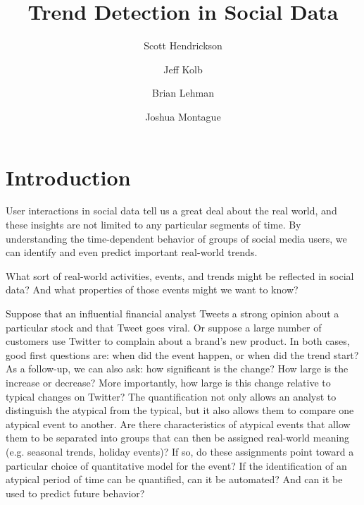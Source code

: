 \documentclass{article}
\title{Trend Detection in Social Data}
\author[]{Scott Hendrickson}
\author[]{Jeff Kolb}
\author[]{Brian Lehman}
\author[]{Joshua Montague}
\affil[]{ \Large{Twitter, Inc.} }
\begin{document}
%

\frenchspacing

\section{Introduction}
\label{intro}

User interactions in social data tell us a great deal about the real world, and
these insights are not limited to any particular segments of time. By
understanding the time-dependent behavior of groups of social media users, we
can identify and even predict important real-world trends.


What sort of real-world activities, events, and trends might be reflected in
social data? And what properties of those events might we want to know?

Suppose that an influential financial analyst Tweets a strong opinion about a
particular stock and that Tweet goes viral. Or suppose a large number of
customers use Twitter to complain about a brand’s new product. In both cases,
good first questions are: when did the event happen, or when did the trend
start? As a follow-up, we can also ask: how significant is the change?  How
large is the increase or decrease? More importantly, how large is this change
relative to typical changes on Twitter? The quantification not only allows an
analyst to distinguish the atypical from the typical, but it also allows them
to compare one atypical event to another. Are there characteristics of atypical
events that allow them to be separated into groups that can then be assigned
real-world meaning (e.g. seasonal trends, holiday events)? If so, do these
assignments point toward a particular choice of quantitative model for the
event? If the identification of an atypical period of time can be quantified,
can it be automated? And can it be used to predict future behavior?
\end{document}
